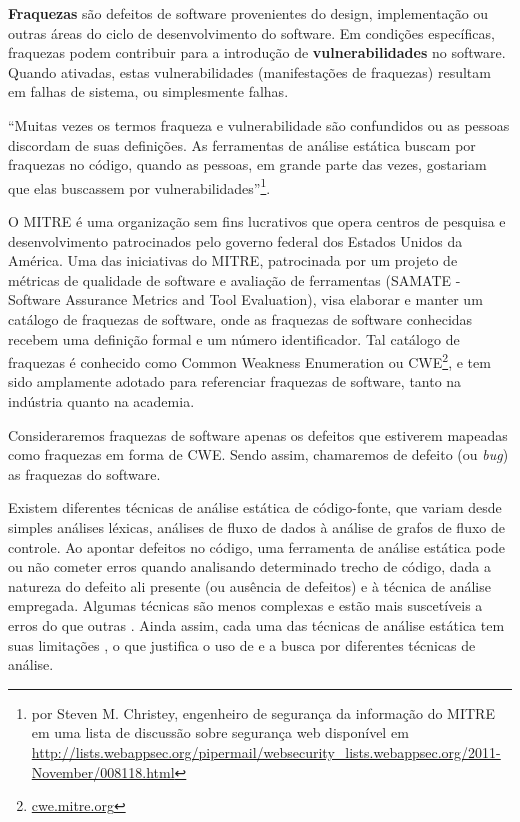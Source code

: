\textbf{Fraquezas} são defeitos de software provenientes do design, implementação ou outras áreas do ciclo de desenvolvimento do software. Em condições específicas, fraquezas podem contribuir para a introdução de \textbf{vulnerabilidades} no software. Quando ativadas, estas vulnerabilidades (manifestações de fraquezas) resultam em falhas de sistema, ou simplesmente falhas.

``Muitas vezes os termos fraqueza e vulnerabilidade são confundidos ou as pessoas discordam de suas definições. As ferramentas de análise estática buscam por fraquezas no código, quando as pessoas, em grande parte das vezes, gostariam que elas buscassem por vulnerabilidades''\footnote{por Steven M. Christey, engenheiro de segurança da informação do MITRE em uma lista de discussão sobre segurança web disponível em \url{http://lists.webappsec.org/pipermail/websecurity_lists.webappsec.org/2011-November/008118.html}}.

O MITRE é uma organização sem fins lucrativos que opera centros de pesquisa e desenvolvimento patrocinados pelo governo federal dos Estados Unidos da América. Uma das iniciativas do MITRE, patrocinada por um projeto de métricas de qualidade de software e avaliação de ferramentas (SAMATE - Software Assurance Metrics and Tool Evaluation), visa elaborar e manter um catálogo de fraquezas de software, onde as fraquezas de software conhecidas recebem uma definição formal e um número identificador. Tal catálogo de fraquezas é conhecido como Common Weakness Enumeration ou CWE\footnote{\url{cwe.mitre.org}}, e tem sido amplamente adotado para referenciar fraquezas de software, tanto na indústria quanto na academia.

Consideraremos fraquezas de software apenas os defeitos que estiverem mapeadas como fraquezas em forma de CWE. Sendo assim, chamaremos de defeito (ou \textit{bug}) as fraquezas do software.

Existem diferentes técnicas de análise estática de código-fonte, que variam desde simples análises léxicas, análises de fluxo de dados à análise de grafos de fluxo de controle. Ao apontar defeitos no código, uma ferramenta de análise estática pode ou não cometer erros quando analisando determinado trecho de código, dada a natureza do defeito ali presente (ou ausência de defeitos) e à técnica de análise empregada. Algumas técnicas são menos complexas e estão mais suscetíveis a erros do que outras \cite{harvard}. Ainda assim, cada uma das técnicas de análise estática tem suas limitações \cite{pascal}, o que justifica o uso de e a busca por diferentes técnicas de análise.


